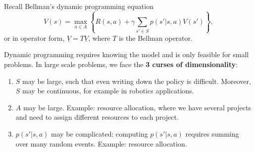 %
\usetikzlibrary{calc}
\usetikzlibrary{shapes,arrows}
%
%
%
%
%
%
%
%
Recall Bellman's dynamic programming equation
$$V(s) = \max_{a \in A} \left\{R(s,a) + \gamma \sum_{s' \in S} p(s'|s,a)V(s')\right\},$$
or in operator form, $\underline{V}=T\underline{V}$, where $T$ is the Bellman operator.

Dynamic programming requires knowing the model and is only feasible for small problems.
In large scale problems, we face the \textbf{3 curses of dimensionality}:

\begin{enumerate}\negspace
\item $S$ may be large, such that even writing down the policy is difficult. Moreover, $S$ may be continuous, for example in robotics applications.
\item $A$ may be large. Example: resource allocation, where we have several projects and need to assign different resources to each project.
\item $p(s'|s,a)$ may be complicated: computing $p(s'|s,a)$ requires summing over many random events. Example: resource allocation.
\end{enumerate}

